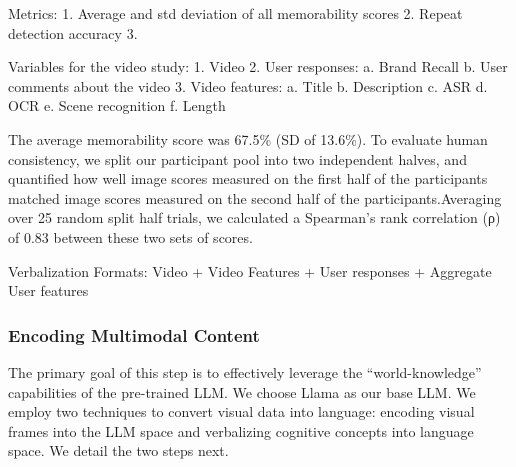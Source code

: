 Metrics:
1. Average and std deviation of all memorability scores
2. Repeat detection accuracy
3. 


Variables for the video study:
  1. Video
  2. User responses:
      a. Brand Recall
      b. User comments about the video
  3. Video features:
      a. Title
      b. Description
      c. ASR
      d. OCR
      e. Scene recognition
      f. Length



The average memorability score was 67.5\% (SD of 13.6\%). 
To evaluate human consistency, we split our participant pool into two independent halves, and quantified how well image scores measured on the first half of the participants matched image scores measured on the second half of the participants.Averaging over 25 random split half trials, we calculated a Spearman's rank correlation (ρ) of 0.83 between these two sets of scores. 

Verbalization Formats:
Video + Video Features + User responses + Aggregate User features

\fi






\subsubsection{Encoding Multimodal Content}
\label{sec:Encoding Visual Content}
The primary goal of this step is to effectively leverage the ``world-knowledge'' capabilities of the pre-trained LLM. We choose Llama \cite{touvron2023llama} as our base LLM. We employ two techniques to convert visual data into language: encoding visual frames into the LLM space and verbalizing cognitive concepts into language space. We detail the two steps next.


